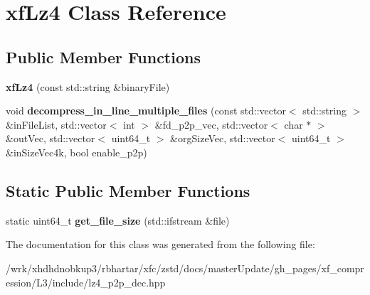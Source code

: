 \hypertarget{classxfLz4}{\section{xf\-Lz4 Class Reference}
\label{classxfLz4}
}
\subsection*{Public Member Functions}
\begin{DoxyCompactItemize}
\item 
\hypertarget{classxfLz4_aa8ba8ffba63ceb3d39a1600ccc36b227}{{\bfseries xf\-Lz4} (const std\-::string \&binary\-File)}\label{classxfLz4_aa8ba8ffba63ceb3d39a1600ccc36b227}

\item 
\hypertarget{classxfLz4_a528f929539a52ae3693c8427da480ba6}{void {\bfseries decompress\-\_\-in\-\_\-line\-\_\-multiple\-\_\-files} (const std\-::vector$<$ std\-::string $>$ \&in\-File\-List, std\-::vector$<$ int $>$ \&fd\-\_\-p2p\-\_\-vec, std\-::vector$<$ char $\ast$ $>$ \&out\-Vec, std\-::vector$<$ uint64\-\_\-t $>$ \&org\-Size\-Vec, std\-::vector$<$ uint64\-\_\-t $>$ \&in\-Size\-Vec4k, bool enable\-\_\-p2p)}\label{classxfLz4_a528f929539a52ae3693c8427da480ba6}

\end{DoxyCompactItemize}
\subsection*{Static Public Member Functions}
\begin{DoxyCompactItemize}
\item 
\hypertarget{classxfLz4_ae646fa73ab42f5b86172d5bedb18f8bd}{static uint64\-\_\-t {\bfseries get\-\_\-file\-\_\-size} (std\-::ifstream \&file)}\label{classxfLz4_ae646fa73ab42f5b86172d5bedb18f8bd}

\end{DoxyCompactItemize}


The documentation for this class was generated from the following file\-:\begin{DoxyCompactItemize}
\item 
/wrk/xhdhdnobkup3/rbhartar/xfc/zstd/docs/master\-Update/gh\-\_\-pages/xf\-\_\-compression/\-L3/include/lz4\-\_\-p2p\-\_\-dec.\-hpp\end{DoxyCompactItemize}
